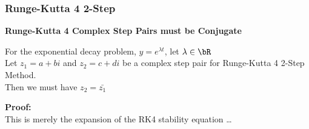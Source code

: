 \subsubsection{Runge-Kutta 4 2-Step}
\begin{theorem}\textbf{Runge-Kutta 4 Complex Step Pairs must be Conjugate}\\
\par For the exponential decay problem, $y=e^{\lambda t}$, let $\lambda \in \bR$\\
Let $z_1 = a + bi$ and $z_2 = c + di$ be a complex step pair for Runge-Kutta 4 2-Step Method.\\
Then we must have $z_2 = \bar{z_1}$\\
\par\textbf{Proof:}\\
This is merely the expansion of the RK4 stability equation \ldots\\

\end{theorem}
